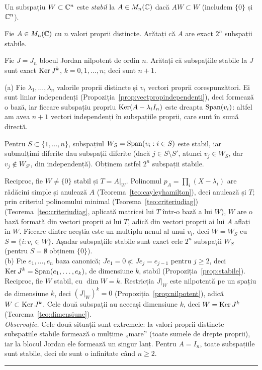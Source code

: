 Un subspațiu $W\subset\mathbb{C}^n$ este \emph{stabil} la $A\in M_n(\mathbb{C})$ dacă $AW\subset W$ (includem $\{0\}$ și $\mathbb{C}^n$).
\begin{parti}
  \item Fie $A\in M_n(\mathbb{C})$ cu $n$ valori proprii distincte. Arătați că $A$ are exact $2^n$ subspații stabile.
  \item Fie $J=J_n$ blocul Jordan nilpotent de ordin $n$. Arătați că subspațiile stabile la $J$ sunt exact $\operatorname{Ker} J^k$, $k=0,1,\dots,n$; deci sunt $n+1$.
\end{parti}
\sol (a) Fie $\lambda_1,\dots,\lambda_n$ valorile proprii distincte și $v_i$ vectori proprii corespunzători. Ei sunt liniar independenți (Propoziția~\ref{prop:vectpropindependenti}), deci formează o bază, iar fiecare subspațiu propriu $\operatorname{Ker}(A-\lambda_iI_n)$ este dreapta $\operatorname{Span}(v_i)$: altfel am avea $n+1$ vectori independenți în subspațiile proprii, care sunt în sumă directă.

Pentru $S\subset\{1,\dots,n\}$, subspațiul $W_S=\operatorname{Span}(v_i:i\in S)$ este stabil, iar submulțimi diferite dau subspații diferite (dacă $j\in S\setminus S'$, atunci $v_j\in W_S$, dar $v_j\notin W_{S'}$, din independență). Obținem astfel $2^n$ subspații stabile.

Reciproc, fie $W\neq\{0\}$ stabil și $T=A|_W$. Polinomul $p_A=\prod_i(X-\lambda_i)$ are rădăcini simple și anulează $A$ (Teorema~\ref{teo:cayleyhamilton}), deci anulează și $T$; prin criteriul polinomului minimal (Teorema~\ref{teo:criteriudiag}) (Teorema~\ref{teo:criteriudiag}, aplicată matricei lui $T$ într-o bază a lui $W$), $W$ are o bază formată din vectori proprii ai lui $T$, adică din vectori proprii ai lui $A$ aflați în $W$. Fiecare dintre aceștia este un multiplu nenul al unui $v_i$, deci $W=W_S$ cu $S=\{i: v_i\in W\}$. Așadar subspațiile stabile sunt exact cele $2^n$ subspații $W_S$ (pentru $S=\emptyset$ obținem $\{0\}$).\\[2pt]
(b) Fie $e_1,\dots,e_n$ baza canonică; $Je_1=0$ și $Je_j=e_{j-1}$ pentru $j\ge2$, deci $\operatorname{Ker} J^k=\operatorname{Span}(e_1,\dots,e_k)$, de dimensiune $k$, stabil (Propoziția~\ref{prop:stabile}). Reciproc, fie $W$ stabil, cu $\dim W=k$. Restricția $J|_W$ este nilpotentă pe un spațiu de dimensiune $k$, deci $(J|_W)^k=0$ (Propoziția~\ref{prop:nilpotent}), adică $W\subset\operatorname{Ker} J^k$. Cele două subspații au aceeași dimensiune $k$, deci $W=\operatorname{Ker} J^k$ (Teorema~\ref{teo:dimensiune}).\\[2pt]
\emph{Observație.} Cele două situații sunt extremele: la valori proprii distincte subspațiile stabile formează o mulțime „mare'' (toate sumele de drepte proprii), iar la blocul Jordan ele formează un singur lanț. Pentru $A=I_n$, toate subspațiile sunt stabile, deci ele sunt o infinitate când $n\ge2$.
\vspace{1mm}\hrule

